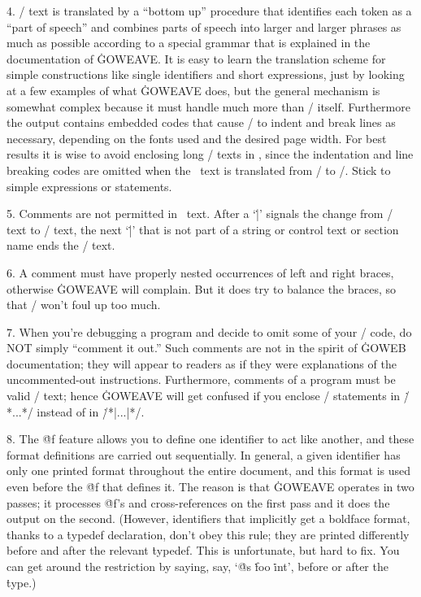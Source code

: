 4. \GO/ text is translated by a ``bottom up'' procedure that
identifies each token as a ``part of speech'' and combines parts of speech
into larger and larger phrases as much as possible according to a special
grammar that is explained in the documentation of \.{GOWEAVE}. It is easy to
learn the translation scheme for simple constructions like single
identifiers and short expressions, just by looking at a few examples of
what \.{GOWEAVE} does, but the general mechanism is somewhat complex because
it must handle much more than \GO/ itself. Furthermore the output
contains embedded codes that cause \TEX/ to indent and break lines as
necessary, depending on the fonts used and the desired page width. For
best results it is wise to avoid enclosing long \GO/ texts in \pb, since the
indentation and line breaking codes are omitted when the \pb\ text is
translated from \GO/ to \TEX/. Stick to simple expressions or
statements.

5. Comments are not permitted in \pb\ text. After a `\.|'
signals the change from \TEX/ text to \GO/ text, the next `\.|' that is
not part of a string or control text or section name ends the \GO/ text.

6. A comment must have properly nested occurrences of left and right
braces, otherwise \.{GOWEAVE} will complain. But it
does try to balance the braces, so that \TEX/ won't foul up too much.

7. When you're debugging a program and decide to omit some of your
\GO/ code, do NOT simply ``comment it out.'' Such comments are not
in the spirit of \.{GOWEB} documentation; they will appear to readers
as if they were explanations of the uncommented-out instructions.
Furthermore, comments of a program must be valid \TEX/ text; hence
\.{GOWEAVE} will get confused if you enclose \GO/ statements in
\.{/*...*/} instead of in \.{/*|...|*/}. 

8. The \.{@f} feature allows you to define one identifier to act like
another, and these format definitions are carried out sequentially.
In general, a given identifier has only one printed format
throughout the entire document, and this format is used even before
the \.{@f} that defines it. The reason is that \.{GOWEAVE} operates in two
passes; it processes \.{@f}'s and cross-references on the first pass and
it does the output on the second.  (However, identifiers that
implicitly get a boldface format, thanks to a \.{typedef} declaration,
don't obey this rule; they are printed differently before and after
the relevant \.{typedef}.  This is unfortunate, but hard to fix. You can
get around the restriction by saying, say, `\.{@s} \.{foo} \.{int}',
before or after the \.{type}.)

